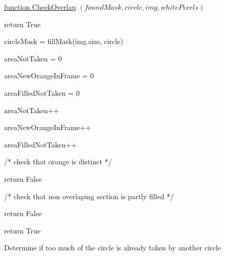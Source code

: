 \documentclass[conference]{IEEEtran}
\begin{document}
\begin{algorithm} 

    \underline{function CheckOverlap} $(foundMask, circle, img, whitePixels)$\;
    
    {
    	return True
    }
        
    circleMask = fillMask(img.size, circle)
    
    areaNotTaken = 0
    
    areaNewOrangeInFrame = 0
    
    areaFilledNotTaken = 0
    
    {
	 {
		{
			areaNotTaken++
		}
		
		{
			areaNewOrangeInFrame++
		}
		
		{
			areaFilledNotTaken++
		}
	 }
    }
    
    /* check that orange is distinct */
    
     {
	return False
    }
    
    /* check that non overlaping section is partly filled */
    
     {
	return False
    }
    
    return True
    
    \caption{Determine if too much of the circle is already taken by another circle} \label{CheckOverlapAlg}
\end{algorithm}
\end{document}
